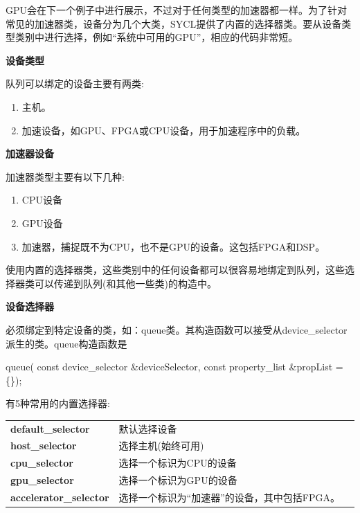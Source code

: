 GPU会在下一个例子中进行展示，不过对于任何类型的加速器都一样。为了针对常见的加速器类，设备分为几个大类，SYCL提供了内置的选择器类。要从设备类型类别中进行选择，例如“系统中可用的GPU”，相应的代码非常短。\par

\hspace*{\fill} \par %
\textbf{设备类型}

队列可以绑定的设备主要有两类:\par

\begin{enumerate}
	\item 主机。
	\item 加速设备，如GPU、FPGA或CPU设备，用于加速程序中的负载。
\end{enumerate}

\hspace*{\fill} \par %
\textbf{加速器设备}

加速器类型主要有以下几种:\par

\begin{enumerate}
	\item CPU设备
	\item GPU设备
	\item 加速器，捕捉既不为CPU，也不是GPU的设备。这包括FPGA和DSP。
\end{enumerate}

使用内置的选择器类，这些类别中的任何设备都可以很容易地绑定到队列，这些选择器类可以传递到队列(和其他一些类)的构造中。\par

\hspace*{\fill} \par %
\textbf{设备选择器}

必须绑定到特定设备的类，如：queue类。其构造函数可以接受从device\_selector派生的类。queue构造函数是\par

\begin{tcolorbox}[colback=green!5!white,colframe=green!75!black]
queue( const device\_selector \&deviceSelector, const property\_list \&propList = \{\});
\end{tcolorbox}

有5种常用的内置选择器:\par

\hspace*{\fill} \par %
\begin{tabular}{lp{10cm}p{10cm}}
	\toprule  %
	\textbf{default\_selector}& 默认选择设备 \\
	\textbf{host\_selector}& 选择主机(始终可用) \\
	\textbf{cpu\_selector}& 选择一个标识为CPU的设备\\
	\textbf{gpu\_selector}& 选择一个标识为GPU的设备\\
	\textbf{accelerator\_selector}&选择一个标识为“加速器”的设备，其中包括FPGA。\\
	\bottomrule %
\end{tabular}

